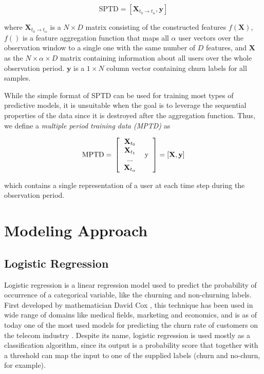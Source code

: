 \documentclass{kththesis}
\begin{document}
\begin{equation}
\text{SPTD} = [\mathbf{X}_{t_0 \rightarrow t_\alpha}, \mathbf{y}]
\end{equation}

where $\mathbf{X}_{t_0\rightarrow t_\alpha}$ is a $N \times D$ matrix consisting of the constructed features $f(\mathbf{X})$, $f()$ is a feature aggregation function that maps all $\alpha$ user vectors over the observation window to a single one with the same number of $D$ features, and  $\mathbf{X}$ as the $N \times \alpha \times D$ matrix containing information about all users over the whole observation period. $\mathbf{y}$ is a $1 \times N$ column vector containing churn labels for all samples. 

While the simple format of SPTD can be used for training most types of predictive models, it is unsuitable when the goal is to leverage the sequential properties of the data since it is destroyed after the aggregation function. Thus, we define a \emph{multiple period training data (MPTD)} as

\begin{equation}
\text{MPTD} = \\
\left [  
  \begin{tabular}{c c}
   $\mathbf{X}_{t_0}$   & \multirow{4}{*}{y} \\
   $\mathbf{X}_{t_1}$ \\
   ... \\
  $\mathbf{X}_{t_\alpha}$ \\
  \end{tabular}
\right ]
= [\mathbf{X}, \mathbf{y}]
\end{equation}

which contains a single representation of a user at each time step during the observation period.

\section{Modeling Approach}

\subsection{Logistic Regression}

Logistic regression is a linear regression model used to predict the probability of occurrence of a categorical variable, like the churning and non-churning labels. First developed by mathematician David Cox \citep{cox1958regression}, this technique has been used in wide range of domains like medical fields, marketing and economics, and is as of today one of the most used models for predicting the churn rate of customers on the telecom industry \citep{mahajan2015review}. Despite its name, logistic regression is used mostly as a classification algorithm, since its output is a probability score that together with a threshold can map the input to one of the supplied labels (churn and no-churn, for example).
\end{document}
